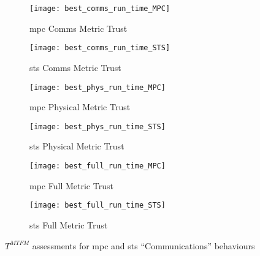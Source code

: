 \begin{figure}
	\begin{subfigure}[b]{0.5\textwidth}
	  \centering
	  \texttt{[image: best\_comms\_run\_time\_MPC]}
	  \caption{\gls{mpc} Comms Metric Trust }
	  \label{fig:comms_time_mpc}
	\end{subfigure}
	\begin{subfigure}[b]{0.5\textwidth}
		\centering
		\texttt{[image: best\_comms\_run\_time\_STS]}
		\caption{\gls{sts} Comms Metric Trust }
		\label{fig:comms_time_sts}
	\end{subfigure}
	
	\begin{subfigure}[b]{0.5\textwidth}
	  \centering
	  \texttt{[image: best\_phys\_run\_time\_MPC]}
	  \caption{\gls{mpc} Physical Metric Trust }
	  \label{fig:phys_time_mpc}
	\end{subfigure}
	\begin{subfigure}[b]{0.5\textwidth}
		\centering
		\texttt{[image: best\_phys\_run\_time\_STS]}
		\caption{\gls{sts} Physical Metric Trust }
		\label{fig:phys_time_sts}
	\end{subfigure}
	
	\begin{subfigure}[b]{0.5\textwidth}
	  \centering
	  \texttt{[image: best\_full\_run\_time\_MPC]}
	  \caption{\gls{mpc} Full Metric Trust }
	  \label{fig:full_time_mpc}
	\end{subfigure}
	\begin{subfigure}[b]{0.5\textwidth}
	  \centering
	  \texttt{[image: best\_full\_run\_time\_STS]}
	  \caption{\gls{sts} Full Metric Trust }
	  \label{fig:full_time_sts}
	\end{subfigure}
	\caption{$T^{MTFM}$ assessments for \gls{mpc} and \gls{sts} ``Communications'' behaviours}
	\label{fig:trust_mpc_sts}
\end{figure}


